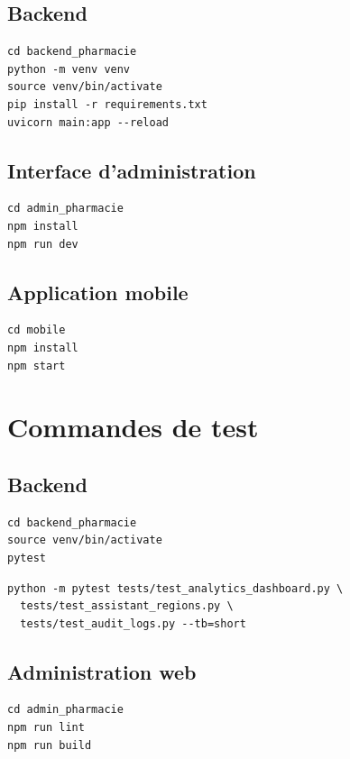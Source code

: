 \subsection*{Backend}

\begin{lstlisting}
cd backend_pharmacie
python -m venv venv
source venv/bin/activate
pip install -r requirements.txt
uvicorn main:app --reload
\end{lstlisting}

\subsection*{Interface d'administration}

\begin{lstlisting}
cd admin_pharmacie
npm install
npm run dev
\end{lstlisting}

\subsection*{Application mobile}

\begin{lstlisting}
cd mobile
npm install
npm start
\end{lstlisting}

\section{Commandes de test}

\subsection*{Backend}

\begin{lstlisting}
cd backend_pharmacie
source venv/bin/activate
pytest
\end{lstlisting}

\begin{lstlisting}
python -m pytest tests/test_analytics_dashboard.py \
  tests/test_assistant_regions.py \
  tests/test_audit_logs.py --tb=short
\end{lstlisting}

\subsection*{Administration web}

\begin{lstlisting}
cd admin_pharmacie
npm run lint
npm run build
\end{lstlisting}

